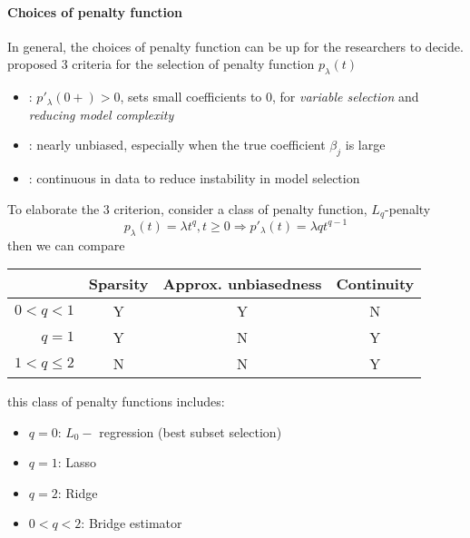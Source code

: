 \documentclass[twoside]{article}
\begin{document}
\paragraph*{Choices of penalty function} In general, the choices of penalty function can be up for the researchers to decide. \citet{fan2001variable} proposed 3 criteria for the selection of penalty function $p_\lambda(t)$
\begin{itemize}
    \item {}: $p'_{\lambda}(0+)>0$, sets small coefficients to 0, for \textit{variable selection} and \textit{reducing model complexity}
    \item {}: nearly unbiased, especially when the true coefficient $\beta_j$ is large
    \item {}: continuous in data to reduce instability in model selection
\end{itemize}
To elaborate the 3 criterion, consider a class of penalty function, $L_q$-penalty 
$$
p_{\lambda}(t) = \lambda t^q, t\geq 0 \Rightarrow p'_{\lambda}(t) = \lambda qt^{q-1}
$$
then we can compare
\begin{center}
    \begin{tabular}{ r|ccc } 
        & Sparsity & Approx. unbiasedness & Continuity \\
     \hline
     $0<q<1$ & Y & Y & N \\
     $q=1$ & Y & N & Y \\
     $1<q\leq 2$ & N & N & Y \\
     \hline
    \end{tabular}
\end{center}
this class of penalty functions includes:
\begin{itemize}
    \item $q=0$: $L_0-$ regression (best subset selection)
    \item $q=1$: Lasso
    \item $q=2$: Ridge
    \item $0<q<2$: Bridge estimator
\end{itemize}
\end{document}
